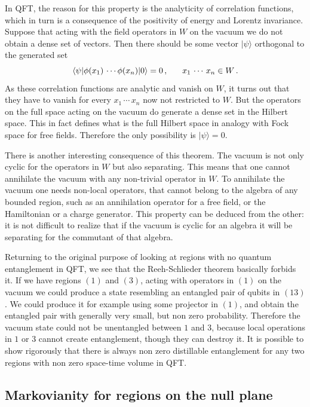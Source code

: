 \documentclass[12pt]{article}
\numberwithin{equation}{section}
\newcommand{\be}{\begin{equation}}
\newcommand{\ee}{\end{equation}}
\begin{document}
In QFT, the reason for this property is the analyticity of correlation functions, which in turn is a consequence of the positivity of energy and Lorentz invariance. Suppose that acting with the field operators in $W$ on the vacuum we do not obtain a dense set of vectors. Then there should be some vector $|\psi\rangle$ orthogonal to the generated set
\be 
\langle \psi|\phi(x_1)\,\cdots \phi(x_n) |0\rangle=0\,,\hspace{.6cm} x_1\,\cdots\,x_n\in W\,. 
 \ee
As these correlation functions are analytic and vanish on $W$, it turns out that they have to vanish for every $x_1\,\cdots\,x_n$ now not restricted to $W$. But the operators on the full space acting on the vacuum do generate a dense set in the Hilbert space. This in fact defines what is the full Hilbert space in analogy with Fock space for free fields. Therefore the only possibility is $|\psi\rangle=0$.   


There is another interesting consequence of this theorem. The vacuum is not only cyclic for the operators in $W$ but also separating. This means that one cannot annihilate the vacuum with any non-trivial operator in $W$. To annihilate the vacuum one needs non-local operators, that cannot belong to the algebra of any bounded region, such as an annihilation operator for a free field, or the Hamiltonian or a charge generator. This property can be deduced from the other: it is not difficult to realize that if the vacuum is cyclic for an algebra it will be separating for the commutant of that algebra.  
 
Returning to the original purpose of looking at regions with no quantum entanglement in QFT, we see that the Reeh-Schlieder theorem basically forbids it. If we have regions $(1)$ and $(3)$, acting with operators in $(1)$ on the vacuum we could produce a state resembling an entangled pair of qubits in $(13)$. We could produce it for example using some projector in $(1)$, and obtain the entangled pair with generally very small, but non zero probability. Therefore the vacuum state could not be unentangled between $1$ and $3$, because local operations in $1$ or $3$ cannot create entanglement, though they can destroy it. It is possible to show rigorously that there is always non zero distillable entanglement for any two regions with non zero space-time volume in QFT.



\subsection{Markovianity for regions on the null plane}
\end{document}
